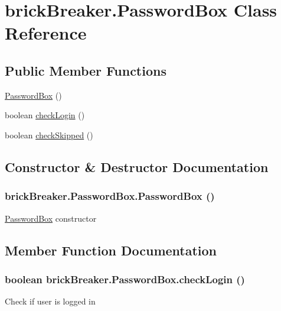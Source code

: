 \hypertarget{classbrick_breaker_1_1_password_box}{
\section{brickBreaker.PasswordBox Class Reference}
\label{classbrick_breaker_1_1_password_box}
}
\subsection*{Public Member Functions}
\begin{DoxyCompactItemize}
\item 
\hyperlink{classbrick_breaker_1_1_password_box_ab0de63e905cbc9226a57bbfbdc852e59}{PasswordBox} ()
\item 
boolean \hyperlink{classbrick_breaker_1_1_password_box_a286ea1727bf1fbaeba6ba928d0779526}{checkLogin} ()
\item 
boolean \hyperlink{classbrick_breaker_1_1_password_box_a88b47539fc6a2f7b7e51a8258d5821de}{checkSkipped} ()
\end{DoxyCompactItemize}


\subsection{Constructor \& Destructor Documentation}
\hypertarget{classbrick_breaker_1_1_password_box_ab0de63e905cbc9226a57bbfbdc852e59}{
\subsubsection[{PasswordBox}]{\setlength{\rightskip}{0pt plus 5cm}brickBreaker.PasswordBox.PasswordBox ()}}
\label{classbrick_breaker_1_1_password_box_ab0de63e905cbc9226a57bbfbdc852e59}
\hyperlink{classbrick_breaker_1_1_password_box}{PasswordBox} constructor 

\subsection{Member Function Documentation}
\hypertarget{classbrick_breaker_1_1_password_box_a286ea1727bf1fbaeba6ba928d0779526}{
\subsubsection[{checkLogin}]{\setlength{\rightskip}{0pt plus 5cm}boolean brickBreaker.PasswordBox.checkLogin ()}}
\label{classbrick_breaker_1_1_password_box_a286ea1727bf1fbaeba6ba928d0779526}
Check if user is logged in

